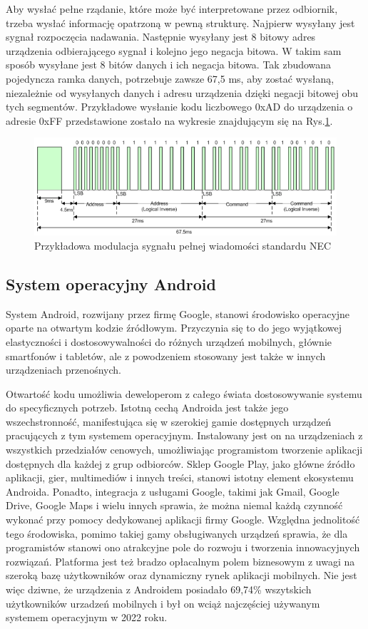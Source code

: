 \documentclass[12pt,twoside]{article}
\begin{document}
Aby wysłać pełne rządanie, które może być interpretowane przez odbiornik, trzeba wysłać informację opatrzoną w pewną strukturę. Najpierw wysyłany jest sygnał rozpoczęcia nadawania. Następnie wysyłany jest 8 bitowy adres urządzenia odbierającego sygnał i kolejno jego negacja bitowa. W takim sam sposób wysyłane jest 8 bitów danych i ich negacja bitowa. Tak zbudowana pojedyncza ramka danych, potrzebuje zawsze 67,5 ms, aby zostać wysłaną, niezależnie od wysyłanych danych i adresu urządzenia dzięki negacji bitowej obu tych segmentów. Przykładowe wysłanie kodu liczbowego 0xAD do urządzenia o adresie 0xFF przedstawione zostało na wykresie znajdującym się na Rys.\ref*{Fig:necFrame}.

\begin{figure}[ht]
   \centering
   \includegraphics[width=13cm]{images/necFrame.png}
   \caption{Przykładowa modulacja sygnału pełnej wiadomości standardu NEC}
   \label{Fig:necFrame}
\end{figure}

\subsection{System operacyjny Android}
System Android, rozwijany przez firmę Google, stanowi środowisko operacyjne oparte na otwartym kodzie źródłowym. Przyczynia się to do jego wyjątkowej elastyczności i dostosowywalności do różnych urządzeń mobilnych, głównie
smartfonów i tabletów, ale z powodzeniem stosowany jest także w innych urządzeniach przenośnych.

Otwartość kodu umożliwia deweloperom z całego świata dostosowywanie systemu do specyficznych potrzeb. Istotną cechą Androida jest także jego wszechstronność, manifestująca się w szerokiej gamie dostępnych
urządzeń pracujących z tym systemem operacyjnym.
Instalowany jest on na urządzeniach z wszystkich przedziałów cenowych, umożliwiając
programistom tworzenie aplikacji dostępnych dla każdej z grup odbiorców. Sklep Google Play, jako główne źródło
aplikacji, gier, multimediów i innych treści, stanowi istotny element ekosystemu Androida. Ponadto, integracja
z usługami Google, takimi jak Gmail, Google Drive, Google Maps i wielu innych sprawia, że można niemal każdą czynność wykonać przy pomocy dedykowanej aplikacji firmy Google. Względna jednolitość tego środowiska, pomimo takiej gamy obsługiwanych urządzeń sprawia, że dla programistów stanowi ono atrakcyjne pole do
rozwoju i tworzenia innowacyjnych rozwiązań. Platforma jest też bradzo opłacalnym polem biznesowym z uwagi na szeroką bazę użytkowników oraz dynamiczny rynek aplikacji mobilnych. Nie jest więc dziwne, że urządzenia z Androidem posiadało 69,74\% wszytskich użytkowników urzadzeń mobilnych i był on wciąż najczęściej używanym systemem operacyjnym w 2022 roku\cite{androidStats}.
\end{document}
